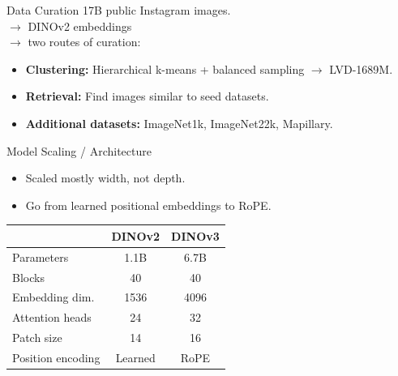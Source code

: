 \begin{frame}{Data Curation}
    17B public Instagram images.\\
    $\rightarrow$ DINOv2 embeddings\\
    $\rightarrow$ two routes of curation:

    \begin{itemize}
        \item \textbf{Clustering:} Hierarchical k-means + balanced sampling $\rightarrow$ LVD-1689M.
        \item \textbf{Retrieval:} Find images similar to seed datasets.
        \item \textbf{Additional datasets:} ImageNet1k, ImageNet22k, Mapillary.
    \end{itemize}

    
\end{frame}

\begin{frame}{Model Scaling / Architecture}
\begin{itemize}
    \item Scaled mostly width, not depth.
    \item Go from learned positional embeddings to RoPE.
\end{itemize}
\begin{table}[h]
\centering
\begin{tabular}{lcc}
\hline
 & \textbf{DINOv2} & \textbf{DINOv3} \\
\hline
Parameters & 1.1B & 6.7B \\
Blocks & 40 & 40 \\
Embedding dim. & 1536 & 4096 \\
Attention heads & 24 & 32 \\
Patch size & 14 & 16 \\
Position encoding & Learned & RoPE \\
\hline
\end{tabular}
\end{table}
\end{frame}

